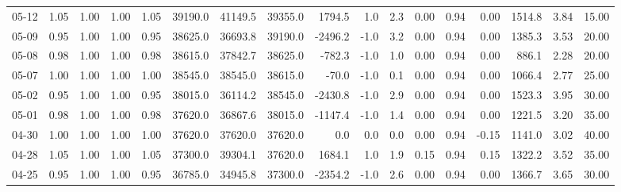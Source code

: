 \begin{threeparttable}
{\begin{tabular}{lrrrrrrrrrrrrrrrr}
  05-12 &         1.05 &           1.00 &          1.00 &          1.05 & 39190.0 & 41149.5 & 39355.0 &     1794.5 &                      1.0 &                 2.3 &       0.00 &      0.94 &           0.00 &           1514.8 &            3.84 &                  15.00 \\
  05-09 &         0.95 &           1.00 &          1.00 &          0.95 & 38625.0 & 36693.8 & 39190.0 &    -2496.2 &                     -1.0 &                 3.2 &       0.00 &      0.94 &           0.00 &           1385.3 &            3.53 &                  20.00 \\
  05-08 &         0.98 &           1.00 &          1.00 &          0.98 & 38615.0 & 37842.7 & 38625.0 &     -782.3 &                     -1.0 &                 1.0 &       0.00 &      0.94 &           0.00 &            886.1 &            2.28 &                  20.00 \\
  05-07 &         1.00 &           1.00 &          1.00 &          1.00 & 38545.0 & 38545.0 & 38615.0 &      -70.0 &                     -1.0 &                 0.1 &       0.00 &      0.94 &           0.00 &           1066.4 &            2.77 &                  25.00 \\
  05-02 &         0.95 &           1.00 &          1.00 &          0.95 & 38015.0 & 36114.2 & 38545.0 &    -2430.8 &                     -1.0 &                 2.9 &       0.00 &      0.94 &           0.00 &           1523.3 &            3.95 &                  30.00 \\
  05-01 &         0.98 &           1.00 &          1.00 &          0.98 & 37620.0 & 36867.6 & 38015.0 &    -1147.4 &                     -1.0 &                 1.4 &       0.00 &      0.94 &           0.00 &           1221.5 &            3.20 &                  35.00 \\
  04-30 &         1.00 &           1.00 &          1.00 &          1.00 & 37620.0 & 37620.0 & 37620.0 &        0.0 &                      0.0 &                 0.0 &       0.00 &      0.94 &          -0.15 &           1141.0 &            3.02 &                  40.00 \\
  04-28 &         1.05 &           1.00 &          1.00 &          1.05 & 37300.0 & 39304.1 & 37620.0 &     1684.1 &                      1.0 &                 1.9 &       0.15 &      0.94 &           0.15 &           1322.2 &            3.52 &                  35.00 \\
  04-25 &         0.95 &           1.00 &          1.00 &          0.95 & 36785.0 & 34945.8 & 37300.0 &    -2354.2 &                     -1.0 &                 2.6 &       0.00 &      0.94 &           0.00 &           1366.7 &            3.65 &                  30.00 \\

\end{tabular}}
\end{threeparttable}

